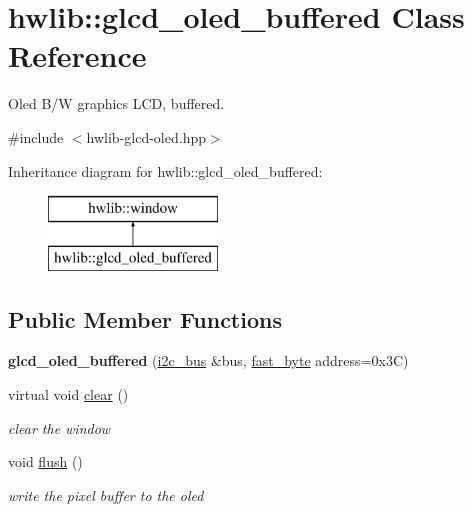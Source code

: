 \hypertarget{classhwlib_1_1glcd__oled__buffered}{}\section{hwlib\+:\+:glcd\+\_\+oled\+\_\+buffered Class Reference}
\label{classhwlib_1_1glcd__oled__buffered}


Oled B/W graphics L\+CD, buffered.  




{\ttfamily \#include $<$hwlib-\/glcd-\/oled.\+hpp$>$}

Inheritance diagram for hwlib\+:\+:glcd\+\_\+oled\+\_\+buffered\+:\begin{figure}[H]
\begin{center}
\leavevmode
\includegraphics[height=2.000000cm]{classhwlib_1_1glcd__oled__buffered}
\end{center}
\end{figure}
\subsection*{Public Member Functions}
\begin{DoxyCompactItemize}
\item 
{\bfseries glcd\+\_\+oled\+\_\+buffered} (\hyperlink{classhwlib_1_1i2c__bus}{i2c\+\_\+bus} \&bus, \hyperlink{hwlib-defines_8hpp_a54998f25522db04b7b797b0fcc9eb3d5}{fast\+\_\+byte} address=0x3\+C)\hypertarget{classhwlib_1_1glcd__oled__buffered_aefdadf4020316b9392325b5d706e08a9}{}\label{classhwlib_1_1glcd__oled__buffered_aefdadf4020316b9392325b5d706e08a9}

\item 
virtual void \hyperlink{classhwlib_1_1glcd__oled__buffered_a1df3ca6d163e33b2edf1242acf47342a}{clear} ()
\begin{DoxyCompactList}\small\item\em clear the window \end{DoxyCompactList}\item 
void \hyperlink{classhwlib_1_1glcd__oled__buffered_a68ed87e12c7f7ed0abe621b14af9d604}{flush} ()
\begin{DoxyCompactList}\small\item\em write the pixel buffer to the oled \end{DoxyCompactList}\end{DoxyCompactItemize}
